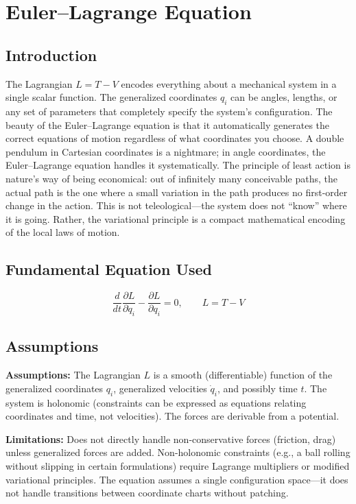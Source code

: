 \chapter{Euler--Lagrange Equation}

\section*{Introduction}

The Lagrangian $L = T - V$ encodes everything about a mechanical system in a single scalar function. The generalized coordinates $q_i$ can be angles, lengths, or any set of parameters that completely specify the system's configuration. The beauty of the Euler--Lagrange equation is that it automatically generates the correct equations of motion regardless of what coordinates you choose. A double pendulum in Cartesian coordinates is a nightmare; in angle coordinates, the Euler--Lagrange equation handles it systematically. The principle of least action is nature's way of being economical: out of infinitely many conceivable paths, the actual path is the one where a small variation in the path produces no first-order change in the action. This is not teleological---the system does not ``know'' where it is going. Rather, the variational principle is a compact mathematical encoding of the local laws of motion.
\section*{Fundamental Equation Used}

\[
\frac{d}{dt}\frac{\partial L}{\partial \dot{q}_i}-\frac{\partial L}{\partial q_i}=0,\qquad L=T-V
\]
\section*{Assumptions}

\textbf{Assumptions:} The Lagrangian $L$ is a smooth (differentiable) function of the generalized coordinates $q_i$, generalized velocities $\dot{q}_i$, and possibly time $t$. The system is holonomic (constraints can be expressed as equations relating coordinates and time, not velocities). The forces are derivable from a potential.


\textbf{Limitations:} Does not directly handle non-conservative forces (friction, drag) unless generalized forces are added. Non-holonomic constraints (e.g., a ball rolling without slipping in certain formulations) require Lagrange multipliers or modified variational principles. The equation assumes a single configuration space---it does not handle transitions between coordinate charts without patching.


